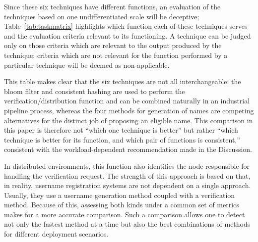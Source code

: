 \documentclass[conference]{IEEEtran}
\begin{document}
Since these six techniques have different functions, an evaluation of the
techniques based on one undifferentiated scale will be deceptive;
Table~\ref{tab:taskmatrix} highlights which function each of these
techniques serves and the evaluation criteria relevant to its
functioning. A technique can be judged only on those criteria which are
relevant to the output produced by the technique; criteria which are
not relevant for the function performed by a particular technique will
be deemed as non-applicable.

\begin{table}[h]
\centering
\caption{Task-specific evaluation matrix}
\label{tab:taskmatrix}
\end{table}

This table makes clear that the six techniques are not all interchangeable:
the bloom filter and consistent hashing are used to perform the
verification/distribution function and can be combined naturally in
an industrial pipeline process, whereas the four methods for
generation of names are competing alternatives for the distinct job
of proposing an eligible name. This comparison in this paper is
therefore not “which one technique is better” but rather
“which technique is better for its function, and which pair of
functions is consistent,” consistent with the workload-dependent
recommendation made in the Discussion.

In distributed environments, this function also identifies the node responsible for handling the verification request. The strength of this approach is based on that, in reality, username registration systems are not dependent on a single approach. Usually, they use a username generation method coupled with a verification method. Because of this, assessing both kinds under a common set of metrics makes for a more accurate comparison. Such a comparison allows one to detect not only the fastest method at a time but also the best combinations of methods for different deployment scenarios.
\end{document}
